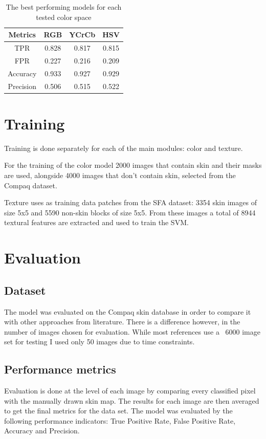 \documentclass[12pt]{report}
\begin{document}
	\begin{table}[h!]
		\begin{center}
			\caption{The best performing models for each tested color space}
			\label{tab:color_space}
			\begin{tabular}{c | c|c|c}
				\textbf{Metrics} & \textbf{RGB} & \textbf{YCrCb} & \textbf{HSV} \\
				\hline
				TPR 	  & 0.828 & 0.817 & 0.815 \\
				FPR 	  & 0.227 & 0.216 & 0.209 \\
				Accuracy  & 0.933 & 0.927 & 0.929 \\
				Precision & 0.506 & 0.515 & 0.522 \\
			\end{tabular}
		\end{center}
	\end{table}
	
	\section{Training}
	Training is done separately for each of the main modules: color and texture.
	
	For the training of the color model 2000 images that contain skin and their masks are used, alongside 4000 images that don't contain skin, selected from the Compaq\cite{compaq} dataset.
	
	Texture uses as training data patches from the SFA dataset\cite{sfa}: 3354 skin images of size 5x5 and 5590 non-skin blocks of size 5x5. From these images a total of 8944 textural features are extracted and used to train the SVM.
	
	\section{Evaluation}
	
	\subsection{Dataset}
	The model was evaluated on the Compaq skin database in order to compare it with other approaches from literature. There is a difference however, in the number of images chosen for evaluation. While most references use a ~6000 image set for testing I used only 50 images due to time constraints.
	
	\subsection{Performance metrics}
	Evaluation is done at the level of each image by comparing every classified pixel with the manually drawn skin map. The results for each image are then averaged to get the final metrics for the data set. The model was evaluated by the following performance indicators: True Positive Rate, False Positive Rate, Accuracy and Precision.
	
\end{document}
